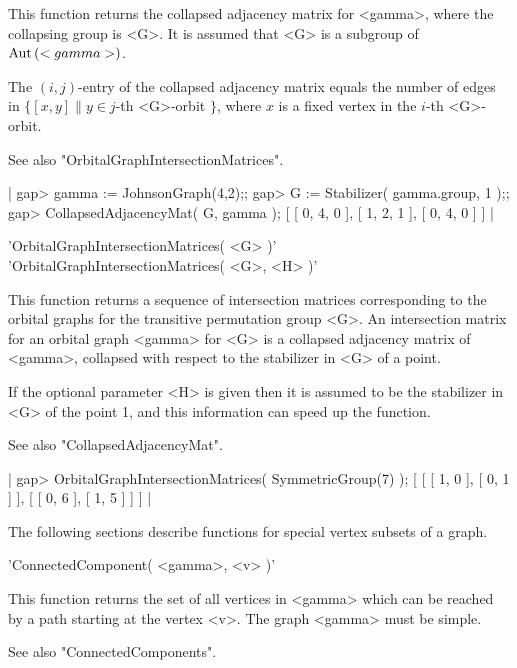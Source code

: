 This function returns  the  collapsed adjacency matrix for <gamma>, where
the  collapsing group  is <G>.  It is assumed  that <G> is  a subgroup of
${\rm Aut}\,(<gamma>)$.

The $(i,j)$-entry of the collapsed adjacency matrix  equals the number of
edges in  $\{ [x,y] \| y \in j$-th <G>-orbit $\}$, where  $x$ is  a fixed
vertex in the $i$-th <G>-orbit.

See also "OrbitalGraphIntersectionMatrices".

|    gap> gamma := JohnsonGraph(4,2);;
    gap> G := Stabilizer( gamma.group, 1 );;
    gap> CollapsedAdjacencyMat( G, gamma );
    [ [ 0, 4, 0 ], [ 1, 2, 1 ], [ 0, 4, 0 ] ] |


'OrbitalGraphIntersectionMatrices( <G> )' \\
'OrbitalGraphIntersectionMatrices( <G>, <H> )'

This  function returns a sequence of intersection  matrices corresponding
to  the orbital  graphs for the  transitive  permutation  group  <G>.  An
intersection matrix for an  orbital  graph <gamma> for <G> is a collapsed
adjacency matrix of <gamma>,  collapsed with respect to the stabilizer in
<G> of a point.

If  the optional  parameter  <H> is  given then it  is assumed to be  the
stabilizer  in <G> of the point 1,  and this information can speed up the
function.

See also "CollapsedAdjacencyMat".

|    gap> OrbitalGraphIntersectionMatrices( SymmetricGroup(7) );
    [ [ [ 1, 0 ], [ 0, 1 ] ], [ [ 0, 6 ], [ 1, 5 ] ] ] |


The following sections describe functions for special vertex subsets of a
graph.


'ConnectedComponent( <gamma>, <v> )'

This function  returns the set  of all vertices  in <gamma> which  can be
reached by a path starting at the vertex  <v>.  The graph <gamma> must be 
simple.

See also "ConnectedComponents".

